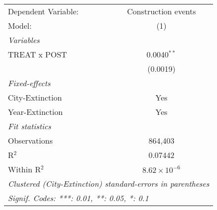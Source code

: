 \begingroup
\centering
\begin{tabular}{lc}
   \tabularnewline \midrule \midrule
   Dependent Variable: & Construction events\\  
   Model:              & (1)\\  
   \midrule
   \emph{Variables}\\
   TREAT x POST        & 0.0040$^{**}$\\   
                       & (0.0019)\\   
   \midrule
   \emph{Fixed-effects}\\
   City-Extinction     & Yes\\  
   Year-Extinction     & Yes\\  
   \midrule
   \emph{Fit statistics}\\
   Observations        & 864,403\\  
   R$^2$               & 0.07442\\  
   Within R$^2$        & $8.62\times 10^{-6}$\\   
   \midrule \midrule
   \multicolumn{2}{l}{\emph{Clustered (City-Extinction) standard-errors in parentheses}}\\
   \multicolumn{2}{l}{\emph{Signif. Codes: ***: 0.01, **: 0.05, *: 0.1}}\\
\end{tabular}
\par\endgroup
